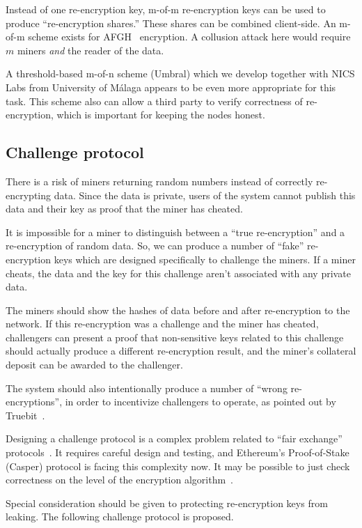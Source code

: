 \documentclass[longbibliography,nofootinbib]{revtex4-1}
\begin{document}
Instead of one re-encryption key, m-of-m re-encryption keys can be used to produce ``re-encryption shares.''
These shares can be combined client-side.
An m-of-m scheme exists for AFGH~\cite{AFGH} encryption.
A collusion attack here would require $m$ miners \emph{and} the reader of the data.

A threshold-based m-of-n scheme (Umbral) which we develop together with NICS Labs from University of M{\'a}laga appears to be even more appropriate for this task.
This scheme also can allow a third party to verify correctness of re-encryption, which is important for keeping the nodes honest.

\subsection{Challenge protocol}
\label{sec:challenge-protocol}

There is a risk of miners returning random numbers instead of correctly re-encrypting data.
Since the data is private, users of the system cannot publish this data and their key as proof that the miner has cheated.

It is impossible for a miner to distinguish between a ``true re-encryption'' and a re-encryption of random data.
So, we can produce a number of ``fake'' re-encryption keys which are designed specifically to challenge the miners.
If a miner cheats, the data and the key for this challenge aren't associated with any private data.

The miners should show the hashes of data before and after re-encryption to the network.
If this re-encryption was a challenge and the miner has cheated, challengers can present a proof that non-sensitive keys related to this challenge should actually
produce a different re-encryption result, and the miner's collateral deposit can be awarded to the challenger.

The system should also intentionally produce a number of ``wrong re-encryptions'', in order to incentivize challengers to operate, as pointed out by
Truebit~\cite{truebit}.

Designing a challenge protocol is a complex problem related to ``fair exchange'' protocols~\cite{BitcoinMPC2016,Bentov2014,AccountableStorage}.
It requires careful design and testing, and Ethereum's Proof-of-Stake (Casper) protocol is facing this complexity now.
It may be possible to just check correctness on the level of the encryption algorithm~\cite{Zhou2002}.

Special consideration should be given to protecting re-encryption keys from leaking.
The following challenge protocol is proposed.
\end{document}
